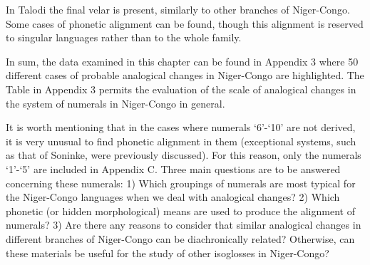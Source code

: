 \begin{table}
\caption{\label{tab:2:23}Kordofanian alignments}

\end{table}

In Talodi the final velar is present, similarly to other branches of Niger-Congo. Some cases of phonetic alignment can be found, though this alignment is reserved to singular languages rather than to the whole family. 

In sum, the data examined in this chapter can be found in Appendix 3 where 50 different cases of probable analogical changes in Niger-Congo are highlighted. The Table in Appendix 3 permits the evaluation of the scale of analogical changes in the system of numerals in Niger-Congo in general. 

It is worth mentioning that in the cases where numerals ‘6’-‘10’ are not derived, it is very unusual to find phonetic alignment in them (exceptional systems, such as that of Soninke, were previously discussed). For this reason, only the numerals ‘1’-‘5’ are included in Appendix C. Three main questions are to be answered concerning these numerals: 1) Which groupings of numerals are most typical for the Niger-Congo languages when we deal with analogical changes? 2) Which phonetic (or hidden morphological) means are used to produce the alignment of numerals? 3) Are there any reasons to consider that similar analogical changes in different branches of Niger-Congo can be diachronically related? Otherwise, can these materials be useful for the study of other isoglosses in Niger-Congo?  

